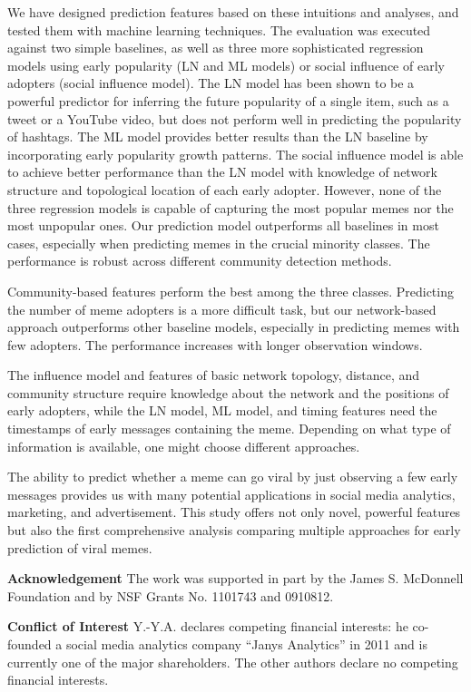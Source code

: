 \documentclass[letterpaper]{article}
\begin{document}
We have designed prediction features based on these intuitions and analyses, and tested them with machine learning techniques. The evaluation was executed against two simple baselines, as well as three more sophisticated regression models using early popularity (LN and ML models) or social influence of early adopters (social influence model).
The LN model has been shown to be a powerful predictor for inferring the future popularity of a single item, such as a tweet or a YouTube video, but does not perform well in predicting the popularity of hashtags.
The ML model provides better results than the LN baseline by incorporating early popularity growth patterns.
The social influence model is able to achieve better performance than the LN model with knowledge of network structure and topological location of each early adopter.
However, none of the three regression models is capable of capturing the most popular memes nor the most unpopular ones.
Our prediction model outperforms all baselines in most cases, especially when predicting memes in the crucial minority classes. The performance is robust across different community detection methods.


Community-based features perform the best among the three classes. Predicting the number of meme adopters is a more difficult task, but our network-based approach outperforms other baseline models, especially in predicting memes with few adopters. The performance increases with longer observation windows.


The influence model and features of basic network topology, distance, and community structure require knowledge about the network and the positions of early adopters, while the LN model, ML model, and timing features need the timestamps of early messages containing the meme.
Depending on what type of information is  available, one might choose different approaches.


The ability to predict whether a meme can go viral by just observing a few early messages provides us with many potential applications in social media analytics, marketing, and advertisement. This study offers not only novel, powerful features but also the first comprehensive analysis comparing multiple approaches for early prediction of viral memes.



\noindent \textbf{Acknowledgement}
The work was supported in part by the James S. McDonnell Foundation and by NSF Grants No. 1101743 and 0910812.

\noindent \textbf{Conflict of Interest}
Y.-Y.A. declares competing financial interests: he co-founded a social media analytics company ``Janys Analytics'' in 2011 and is currently one of the major shareholders. The other authors declare no competing financial interests.
\end{document}
